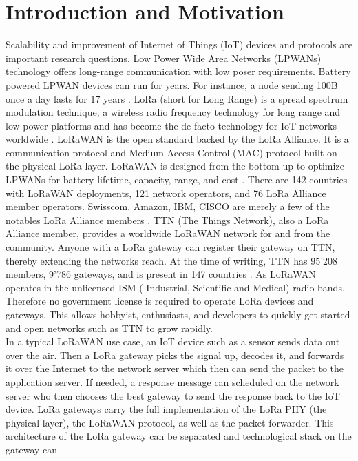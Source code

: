 \chapter{Introduction and Motivation}
Scalability and improvement of Internet of Things (IoT) devices and protocols
are important research questions.
Low Power Wide Area Networks (LPWANs) technology offers long-range communication
with low poser requirements. Battery powered LPWAN devices can run for years.
For instance, a node sending 100B once a day lasts for 17 years \cite{morin}.
LoRa (short for Long Range) is a spread spectrum modulation
technique, a wireless radio frequency technology for long range and low power platforms
and has become the de facto technology for IoT networks worldwide \cite{what_is_lora}.
LoRaWAN is the open standard backed by the LoRa Alliance. It is a communication protocol and
Medium Access Control (MAC) protocol built on the physical LoRa layer.
LoRaWAN is designed from the bottom up to optimize LPWANs
for battery lifetime, capacity, range, and cost \cite{what_is_lora_wan}.
There are 142 countries with LoRaWAN deployments, 121 network operators,
and 76 LoRa Alliance member operators. Swisscom, Amazon, IBM, CISCO are merely a few of the 
notables LoRa Alliance members \cite{lora_alliance}.
TTN (The Things Network), also a LoRa Alliance member, provides a worldwide LoRaWAN network 
for and from the community. Anyone with a LoRa gateway can register their gateway on TTN, thereby
extending the networks reach. At the time of writing, TTN has 95'208 members, 9'786 gateways, and is
present in 147 countries \cite{ttn}. As LoRaWAN operates in the unlicensed ISM ( Industrial, Scientific and Medical)
radio bands. Therefore no government license is required to operate LoRa devices and gateways. 
This allows hobbyist, enthusiasts, and developers to quickly get started and open networks such as TTN
to grow rapidly.
\\
In a typical LoRaWAN use case, an IoT device such as a sensor sends data out over the air. Then a LoRa gateway picks
the signal up, decodes it, and forwards it over the Internet to the network server which then can send the packet to 
the application server. If needed, a response message can scheduled on the network server who then chooses the best gateway
to send the response back to the IoT device.
LoRa gateways carry the full implementation of the LoRa PHY (the physical layer), the LoRaWAN protocol, as well as 
the packet forwarder. This architecture of the LoRa gateway can be separated and technological stack on the gateway can 
